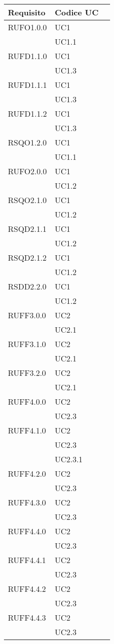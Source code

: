 \begin{center}
\begin{longtable}{lp{}l}
\toprule Requisito & Codice UC\\
\midrule
RUFO1.0.0 & UC1 \\
 & UC1.1 \\
RUFD1.1.0 & UC1 \\
 & UC1.3 \\
RUFD1.1.1 & UC1 \\
 & UC1.3 \\
RUFD1.1.2 & UC1 \\
 & UC1.3 \\
RSQO1.2.0 & UC1 \\
 & UC1.1 \\
RUFO2.0.0 & UC1 \\
 & UC1.2 \\
RSQO2.1.0 & UC1 \\
 & UC1.2 \\
RSQD2.1.1 & UC1 \\
 & UC1.2 \\
RSQD2.1.2 & UC1 \\
 & UC1.2 \\
RSDD2.2.0 & UC1 \\
 & UC1.2 \\
RUFF3.0.0 & UC2 \\
 & UC2.1 \\
RUFF3.1.0 & UC2 \\
 & UC2.1 \\
RUFF3.2.0 & UC2 \\
 & UC2.1 \\
RUFF4.0.0 & UC2 \\
 & UC2.3 \\
RUFF4.1.0 & UC2 \\
 & UC2.3 \\
 & UC2.3.1 \\
RUFF4.2.0 & UC2 \\
 & UC2.3 \\
RUFF4.3.0 & UC2 \\
 & UC2.3 \\
RUFF4.4.0 & UC2 \\
 & UC2.3 \\
RUFF4.4.1 & UC2 \\
 & UC2.3 \\
RUFF4.4.2 & UC2 \\
 & UC2.3 \\
RUFF4.4.3 & UC2 \\
 & UC2.3 \\

\end{longtable}
\end{center}
